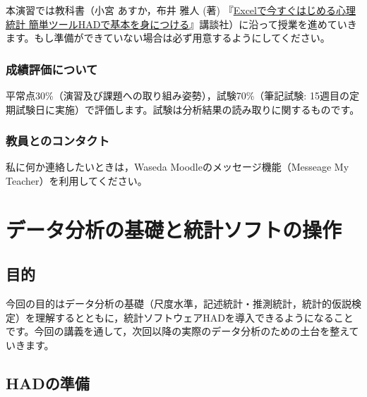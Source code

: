 \documentclass[
]{book}
\theoremstyle{definition}
\theoremstyle{definition}
\theoremstyle{definition}
\theoremstyle{definition}
\theoremstyle{remark}
\begin{document}
本演習では教科書（小宮 あすか，布井 雅人 (著) 『\href{https://www.kspub.co.jp/book/detail/1548121.html}{Excelで今すぐはじめる心理統計 簡単ツールHADで基本を身につける}』講談社）に沿って授業を進めていきます。もし準備ができていない場合は必ず用意するようにしてください。

\hypertarget{ux6210ux7e3eux8a55ux4fa1ux306bux3064ux3044ux3066}{%
\subsection*{成績評価について}\label{ux6210ux7e3eux8a55ux4fa1ux306bux3064ux3044ux3066}}

平常点30\%（演習及び課題への取り組み姿勢），試験70\%（筆記試験: 15週目の定期試験日に実施）で評価します。試験は分析結果の読み取りに関するものです。

\hypertarget{ux6559ux54e1ux3068ux306eux30b3ux30f3ux30bfux30afux30c8}{%
\subsection*{教員とのコンタクト}\label{ux6559ux54e1ux3068ux306eux30b3ux30f3ux30bfux30afux30c8}}

私に何か連絡したいときは，Waseda Moodleのメッセージ機能（Messeage My Teacher）を利用してください。

\hypertarget{ux30c7ux30fcux30bfux5206ux6790ux306eux57faux790eux3068ux7d71ux8a08ux30bdux30d5ux30c8ux306eux64cdux4f5c}{%
\chapter{データ分析の基礎と統計ソフトの操作}\label{ux30c7ux30fcux30bfux5206ux6790ux306eux57faux790eux3068ux7d71ux8a08ux30bdux30d5ux30c8ux306eux64cdux4f5c}}

\hypertarget{ux76eeux7684}{%
\section{目的}\label{ux76eeux7684}}

今回の目的はデータ分析の基礎（尺度水準，記述統計・推測統計，統計的仮説検定）を理解するとともに，統計ソフトウェアHADを導入できるようになることです。今回の講義を通して，次回以降の実際のデータ分析のための土台を整えていきます。

\hypertarget{hadux306eux6e96ux5099}{%
\section{HADの準備}\label{hadux306eux6e96ux5099}}
\end{document}
